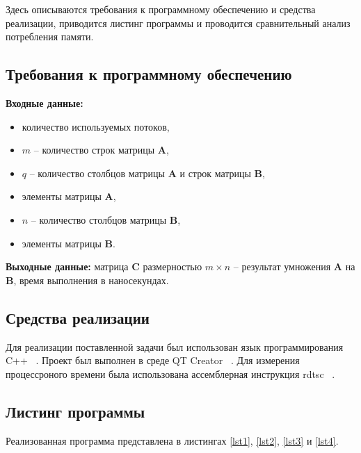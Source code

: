 \documentclass[a4paper,12pt]{article}
\begin{document}
Здесь описываются требования к программному 
обеспечению и средства реализации, приводится листинг 
программы и проводится сравнительный анализ 
потребления памяти.

\subsection{Требования к программному обеспечению}

\begin{flushleft}
	\textbf{Входные данные:} 
	\begin{itemize}
		\item количество используемых потоков,
		\item $m$ -- количество строк
		матрицы $\mathbf{A}$,
		\item $q$ -- количество столбцов
		матрицы $\mathbf{A}$ и строк матрицы $\mathbf{B}$,
		\item элементы матрицы $\mathbf{A}$,
		\item $n$ -- количество столбцов матрицы $\mathbf{B}$,
		\item элементы матрицы $\mathbf{B}$.
	\end{itemize}
	
	\textbf{Выходные данные:} матрица $\mathbf{C}$ 
	размерностью
	$m \times n$ -- результат умножения $\mathbf{A}$
	на $\mathbf{B}$, время выполнения в наносекундах.
\end{flushleft}

\subsection{Средства реализации}

Для реализации поставленной задачи был использован язык программирования C++ ~\cite{c}. Проект был выполнен в среде QT Creator ~\cite{qt}. Для измерения процессроного времени была использована ассемблерная инструкция rdtsc ~\cite{rdtsc}.

\subsection{Листинг программы}

Реализованная программа представлена
в листингах \ref{lst1}, \ref{lst2}, \ref{lst3} и \ref{lst4}.
\end{document}
